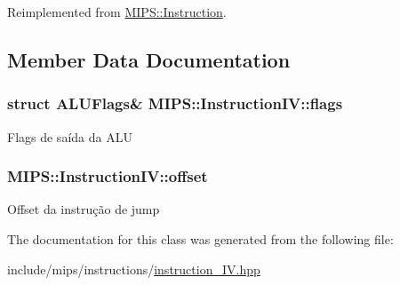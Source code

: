 Reimplemented from \hyperlink{classMIPS_1_1Instruction_a7df847adef2997446ffca9b71c2f3112}{M\+I\+P\+S\+::\+Instruction}.



\subsection{Member Data Documentation}
\subsubsection[{\texorpdfstring{flags}{flags}}]{\setlength{\rightskip}{0pt plus 5cm}struct {\bf A\+L\+U\+Flags}\& M\+I\+P\+S\+::\+Instruction\+I\+V\+::flags\hspace{0.3cm}{\ttfamily [protected]}}\hypertarget{classMIPS_1_1InstructionIV_a7858449be2ee97f8ed852f7b8e8b4879}{}\label{classMIPS_1_1InstructionIV_a7858449be2ee97f8ed852f7b8e8b4879}
Flags de saída da A\+LU 
\subsubsection[{\texorpdfstring{offset}{offset}}]{ M\+I\+P\+S\+::\+Instruction\+I\+V\+::offset\hspace{0.3cm}{\ttfamily [protected]}}\hypertarget{classMIPS_1_1InstructionIV_abcb91e65c800a41bf9c46b5770120b36}{}\label{classMIPS_1_1InstructionIV_abcb91e65c800a41bf9c46b5770120b36}
Offset da instrução de jump 

The documentation for this class was generated from the following file\+:\begin{DoxyCompactItemize}
\item 
include/mips/instructions/\hyperlink{instruction__IV_8hpp}{instruction\+\_\+\+I\+V.\+hpp}\end{DoxyCompactItemize}
